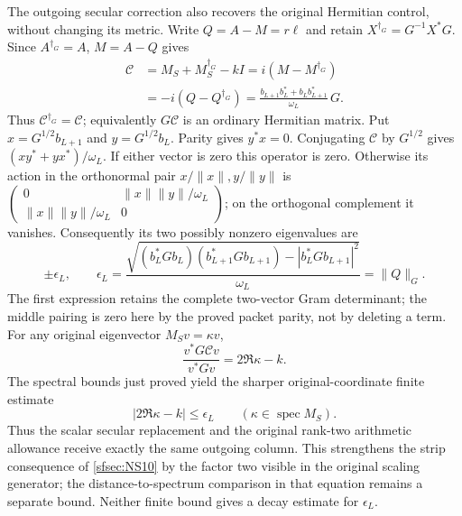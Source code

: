 \documentclass[11pt]{article}
\begin{document}
The outgoing secular correction also recovers the
original Hermitian control, without changing its
metric. Write $Q=A-M=r\ell$ and retain
$X^{\dagger_G}=G^{-1}X^*G$. Since $A^{\dagger_G}=A$,
$M=A-Q$ gives
\begin{equation}\tag{NS35}\label{sfsec:NS35}
\begin{split}
\mathcal C
&=M_S+M_S^{\dagger_G}-kI
=i(M-M^{\dagger_G})\\
&=-i(Q-Q^{\dagger_G})
=\frac{b_{L+1}b_L^*+b_Lb_{L+1}^*}{\omega_L}\,G .
\end{split}
\end{equation}
Thus $\mathcal C^{\dagger_G}=\mathcal C$; equivalently
$G\mathcal C$ is an ordinary Hermitian matrix.
Put $x=G^{1/2}b_{L+1}$ and $y=G^{1/2}b_L$.
Parity gives $y^*x=0$. Conjugating $\mathcal C$ by
$G^{1/2}$ gives $(xy^*+yx^*)/\omega_L$.
If either vector is zero this operator is zero.
Otherwise its action in the orthonormal pair
$x/\|x\|,y/\|y\|$ is
$\left(\begin{smallmatrix}0&\|x\|\|y\|/\omega_L\\
\|x\|\|y\|/\omega_L&0\end{smallmatrix}\right)$;
on the orthogonal complement it vanishes. Consequently
its two possibly nonzero eigenvalues are
\begin{equation}\tag{NS36}\label{sfsec:NS36}
\pm\epsilon_L,\qquad
\epsilon_L=
\frac{\sqrt{(b_L^*Gb_L)(b_{L+1}^*Gb_{L+1})
                 -|b_L^*Gb_{L+1}|^2}}{\omega_L}
=\|Q\|_G .
\end{equation}
The first expression retains the complete two-vector
Gram determinant; the middle pairing is zero here
by the proved packet parity, not by deleting a term.
For any original eigenvector $M_Sv=\kappa v$,
\[
\frac{v^*G\mathcal C v}{v^*Gv}=2\Re\kappa-k.
\]
The spectral bounds just proved yield the sharper
original-coordinate finite estimate
\begin{equation}\tag{NS37}\label{sfsec:NS37}
|2\Re\kappa-k|\leq\epsilon_L
\qquad(\kappa\in\operatorname{spec}M_S).
\end{equation}
Thus the scalar secular replacement and the original
rank-two arithmetic allowance receive exactly the
same outgoing column. This strengthens the strip
consequence of \eqref{sfsec:NS10} by the factor two
visible in the original scaling generator; the
distance-to-spectrum comparison in that equation
remains a separate bound. Neither
finite bound gives a decay estimate for $\epsilon_L$.
\end{document}
